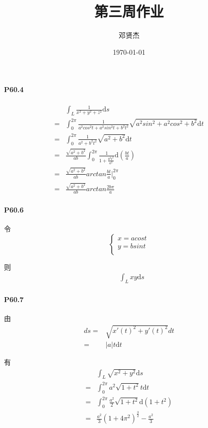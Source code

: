\documentclass[UTF8]{ctexart}
\title{第三周作业}
\author{邓贤杰}
\date{\today}
\begin{document}
    \maketitle
    \paragraph*{P60.4}
    \begin{align*}
        &\int_{L}^{} \frac{1}{x^2+y^2+z^2} \mathrm{d}s \\
        =& \int_{0}^{2\pi} \frac{1}{a^2 cos^2t + a^2 sin^2t +b^2t^2} \sqrt{a^2sin^2+a^2cos^2+b^2} \mathrm{d}t \\
        =& \int_{0}^{2\pi} \frac{1}{a^2+b^2t^2} \sqrt{a^2+b^2} \mathrm{d}t \\ 
        =& \frac{\sqrt{a^2+b^2}}{ab} \int_{0}^{2\pi} \frac{1}{1+\frac{b^2t^2}{a^2} }\mathrm{d}\left(\frac{bt}{a}\right) \\
        =& \frac{\sqrt{a^2+b^2}}{ab} arctan \frac{bt}{a} \big|_{0}^{2\pi} \\
        =& \frac{\sqrt{a^2+b^2}}{ab} arctan \frac{2b\pi}{a}
    \end{align*}
    \paragraph*{P60.6}

    令
    \begin{equation}
     \begin{cases}
         x = acost \\
        y = bsint \\
     \end{cases}
    \end{equation}

    则
    \begin{align*}
        &\int_{L} xy \mathrm{d}s
    \end{align*}
    \paragraph*{P60.7}

    由
    \begin{align*}
        ds =& \sqrt{x'(t)^2 + y'(t)^2} dt \\
        =& |a|t \mathrm{d}t  
    \end{align*}

    有
    \begin{align*}
        &\int_{L} \sqrt{x^2+y^2} \mathrm{d}s \\
        =& \int_{0}^{2\pi} a^2\sqrt{1+t^2}t \mathrm{d}t \\
        =& \int_{0}^{2\pi} \frac{a^2}{2} \sqrt{1+t^2} \mathrm{d}(1+t^2) \\
        =& \frac{a^2}{3} (1+4\pi^2)^{\frac{3}{2} } - \frac{a^2}{3} 
    \end{align*}
\end{document}

